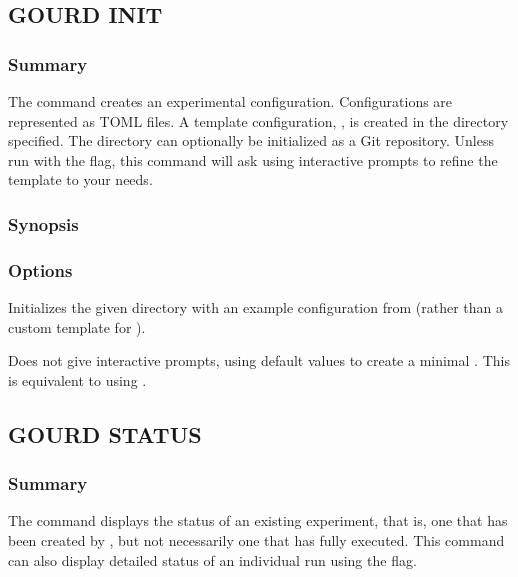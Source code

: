 \documentclass[a4paper,english]{article}
\begin{document}
\begin{adjustwidth}{18pt}{0pt}
        \subsection{GOURD INIT}

            \subsubsection{Summary}
                The   command creates an experimental configuration.
                Configurations are represented as TOML files.
                A template configuration, , is created in the directory specified.
                The directory can optionally be initialized as a Git repository.
                Unless run with the  flag, this command will ask using interactive prompts
                to refine the template to your needs.

            \subsubsection{Synopsis}
                 

            \subsubsection{Options}
                \begin{Description}[Options]
                \item[\OptArg{-e, --example}{ example-name}]
                Initializes the given directory with an example configuration from 
                (rather than a custom template for ).
                \item[\Opt{-q, --quick}]
                Does not give interactive prompts, using default values to create a minimal .
                This is equivalent to using .
                \end{Description}

        \subsection{GOURD STATUS}

            \subsubsection{Summary}
                The   command displays the status of an existing experiment,
                that is, one that has been created by  , but not necessarily
                one that has fully executed.
                This command can also display detailed status of an individual run using the  flag.


\end{adjustwidth}
\end{document}
